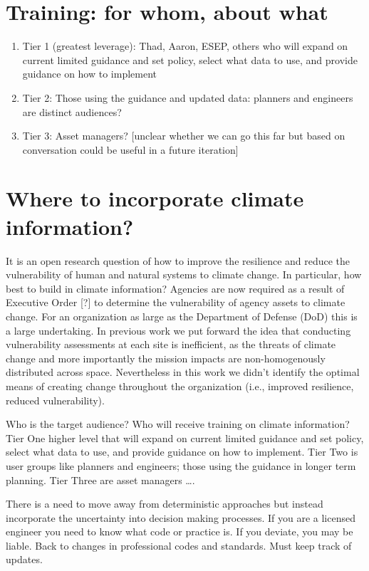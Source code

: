 \documentclass[10pt]{amsart}
\begin{document}
\section{Training: for whom, about what}
\begin{enumerate}
\item Tier 1 (greatest leverage): Thad, Aaron, ESEP, others who will expand on current limited guidance and set policy, select what data to use, and provide guidance on how to implement
\item Tier 2: Those using the guidance and updated data: planners and engineers are distinct audiences? 
\item Tier 3: Asset managers? [unclear whether we can go this far but based on conversation could be useful in a future iteration]
\end{enumerate}

\section{Where to incorporate climate information?}
It is an open research question of how to improve the resilience and reduce the vulnerability of human and natural systems to climate change.
In particular, how best to build in climate information? 
Agencies are now required as a result of Executive Order [?] to determine the vulnerability of agency assets to climate change.
For an organization as large as the Department of Defense (DoD) this is a large undertaking. 
In previous work we put forward the idea that conducting vulnerability assessments at each site is inefficient, as the threats of climate change and more importantly the mission impacts are non-homogenously distributed across space.
Nevertheless in this work we didn't identify the optimal means of creating change throughout the organization (i.e., improved resilience, reduced vulnerability).

Who is the target audience?
Who will receive training on climate information?
Tier One higher level that will expand on current limited guidance and set policy, select what data to use, and provide guidance on how to implement.
Tier Two is user groups like planners and engineers; those using the guidance in longer term planning.
Tier Three are asset managers \ldots.

There is a need to move away from deterministic approaches but instead incorporate the uncertainty into decision making processes.
If you are a licensed engineer you need to know what code or practice is. 
If you deviate, you may be liable. Back to changes in professional codes and standards. 
Must keep track of updates.
\end{document}
